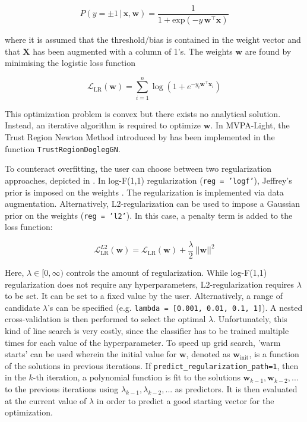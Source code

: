 \documentclass[utf8]{frontiersSCNS} %
\newcommand{\w}{\mathbf{w}}
\newcommand{\x}{\mathbf{x}}
\renewcommand{\L}{\mathcal{L}}
\newcommand{\X}{\mathbf{X}}
\newcommand{\ttt}[1]{\texttt{#1}}
\begin{document}
\begin{equation}
\label{eq:logreg_probability}
P(y = \pm 1\,|\,\x,\w) = \frac{1}{1 + \text{exp}(-y\,\w^\top\x)}
\end{equation}

where it is assumed that the threshold/bias is contained in the weight vector and that $\X$ has been augmented with a column of 1's. The weights $\w$ are found by minimising the logistic loss function

\begin{equation}
\label{eq:logreg_loss_function}
\L_\text{LR}(\w) = \sum_{i=1}^n \log(1 + e^{-y_i\w^\top\x_i})
\end{equation}

This optimization problem is convex but there exists no analytical solution. Instead, an iterative algorithm is required to optimize $\w$. In MVPA-Light, the Trust Region Newton Method introduced by \cite{Lin2007TrustRegression} has been implemented in the function \ttt{TrustRegionDoglegGN}.

To counteract overfitting, the user can choose between two regularization approaches, depicted in . In log-F(1,1) regularization (\ttt{reg = 'logf'}), Jeffrey's prior is imposed on the weights \citep{Firth1993BiasEstimates,Rahman2017PerformanceData.,King2001}. The regularization is implemented via data augmentation. Alternatively, L2-regularization can be used to impose a Gaussian prior on the weights (\ttt{reg = 'l2'}). In this case, a penalty term is added to the loss function:

\begin{equation}
\label{eq:logreg_loss_function_plus_penalty}
\L_\text{LR}^{L2}(\w) = \L_\text{LR}(\w) + \frac{\lambda}{2}\, ||\w||^2
\end{equation}

Here, $\lambda\in [0,\infty)$ controls the amount of regularization. While log-F(1,1) regularization does not require any hyperparameters, L2-regularization requires $\lambda$ to be set. It can be set to a fixed value by the user. Alternatively, a range of candidate $\lambda$'s can be specified (e.g. \ttt{lambda = [0.001, 0.01, 0.1, 1]}). A nested cross-validation is then performed to select the optimal $\lambda$.
Unfortunately, this kind of line search is very costly, since the classifier has to be trained multiple times for each value of the hyperparameter. To speed up grid search, 'warm starts' can be used wherein the initial value for $\w$, denoted as  $\w_\text{init}$, is a function of the solutions in previous iterations. If \ttt{predict\_regularization\_path=1}, then in the $k$-th iteration, a polynomial function is fit to the solutions $\w_{k-1},\w_{k-2},...$ to the previous iterations  using $\lambda_{k-1}, \lambda_{k-2}, ...$ as predictors. It is then evaluated at the current value of $\lambda$ in order to predict a good starting vector for the optimization.
\end{document}
